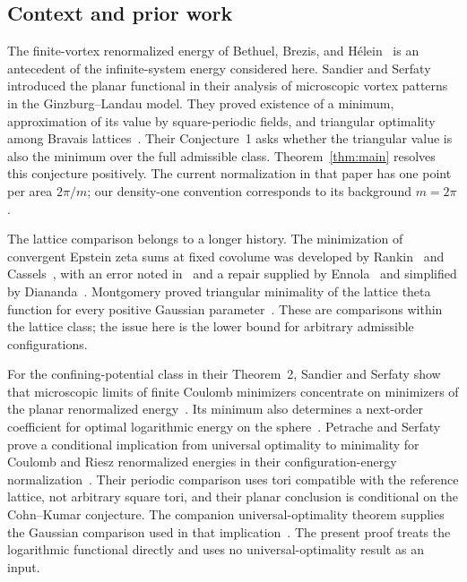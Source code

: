 \subsection{Context and prior work}

The finite-vortex renormalized energy of Bethuel, Brezis, and
H\'elein~\cite{BethuelBrezisHelein1994} is an antecedent of the
infinite-system energy considered here. Sandier and Serfaty introduced
the planar functional in their analysis of microscopic vortex patterns
in the Ginzburg--Landau model. They proved existence of a minimum,
approximation of its value by square-periodic fields, and triangular
optimality among Bravais lattices~\cite[Theorems~1 and~2]{SandierSerfaty2012}.
Their Conjecture~1 asks whether the triangular value is also the minimum
over the full admissible class. Theorem~\ref{thm:main} resolves this
conjecture positively. The current normalization in that paper has one
point per area $2\pi/m$; our density-one convention corresponds to its
background $m=2\pi$.

The lattice comparison belongs to a longer history. The minimization of
convergent Epstein zeta sums at fixed covolume was developed by
Rankin~\cite{Rankin1953} and Cassels~\cite{Cassels1959}, with an error
noted in~\cite{Cassels1963Corrigendum} and a repair supplied by
Ennola~\cite{Ennola1964Lemma} and simplified by Diananda~\cite{Diananda1964}.
Montgomery proved triangular minimality of the lattice theta function
for every positive Gaussian parameter~\cite[Theorem~1]{Montgomery1988}.
These are comparisons within the lattice class; the issue here is the
lower bound for arbitrary admissible configurations.

For the confining-potential class in their Theorem~2, Sandier and
Serfaty show that microscopic limits of finite Coulomb minimizers
concentrate on minimizers of the planar renormalized
energy~\cite[Theorem~2]{SandierSerfaty2015}.  Its minimum also determines
a next-order coefficient for optimal logarithmic energy on the
sphere~\cite[Theorem~1.5]{BeterminSandier2018}.  Petrache and Serfaty
prove a conditional implication from universal optimality to minimality
for Coulomb and Riesz renormalized energies in their configuration-energy
normalization~\cite[Theorem~2 and Corollary~4]{PetracheSerfaty2020}.
Their periodic comparison uses tori compatible with the reference
lattice, not arbitrary square tori, and their planar conclusion is
conditional on the Cohn--Kumar conjecture.  The companion universal-optimality
theorem supplies the Gaussian comparison used in that
implication~\cite[Theorem~1.1 and Corollary~1.3]{UniversalOptimality2026}.
The present proof treats
the logarithmic functional directly and uses no universal-optimality
result as an input.

